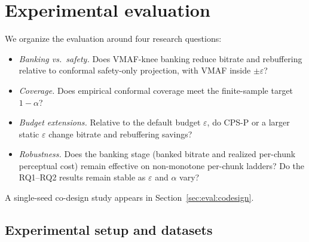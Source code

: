 \section{Experimental evaluation}
\label{sec:eval}

We organize the evaluation around four research questions:

\begin{itemize}
  \item[\textbf{RQ1}] \emph{Banking vs.\ safety.} Does VMAF-knee banking reduce bitrate and rebuffering relative to conformal safety-only projection, with VMAF inside \(\pm\varepsilon\)?
  \item[\textbf{RQ2}] \emph{Coverage.} Does empirical conformal coverage meet the finite-sample target \(1{-}\alpha\)?
  \item[\textbf{RQ3}] \emph{Budget extensions.} Relative to the default budget \(\varepsilon\), do CPS-P or a larger static \(\varepsilon\) change bitrate and rebuffering savings?
  \item[\textbf{RQ4}] \emph{Robustness.} Does the banking stage (banked bitrate and realized per-chunk perceptual cost) remain effective on non-monotone per-chunk ladders? Do the RQ1--RQ2 results remain stable as \(\varepsilon\) and \(\alpha\) vary?
\end{itemize}
A single-seed co-design study appears in Section~\ref{sec:eval:codesign}.

\subsection{Experimental setup and datasets}
\label{sec:eval:setup}

